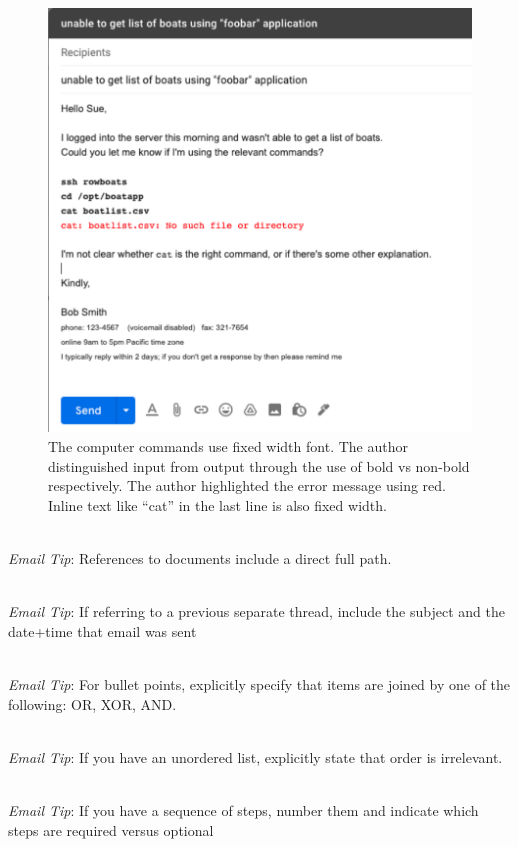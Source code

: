 \begin{figure}
\includegraphics[width=1\textwidth]{images/email_computer_font.pdf}
\caption{The computer commands use fixed width font. The author distinguished input from output through the use of bold vs non-bold respectively. The author highlighted the error message using red. Inline text like ``cat'' in the last line is also fixed width.}
\label{fig:email_computer_font}
\end{figure}

\ \\
\textit{Email Tip}: References to documents include a direct full path.

\ \\
\textit{Email Tip}: If referring to a previous separate thread, include the subject and the date+time that email was sent

\ \\
\textit{Email Tip}: For bullet points, explicitly specify that items are joined by one of the following: OR, XOR, AND.

\ \\
\textit{Email Tip}: If you have an unordered list, explicitly state that order is irrelevant.

\ \\
\textit{Email Tip}: If you have a sequence of steps, number them and indicate which steps are required versus optional

